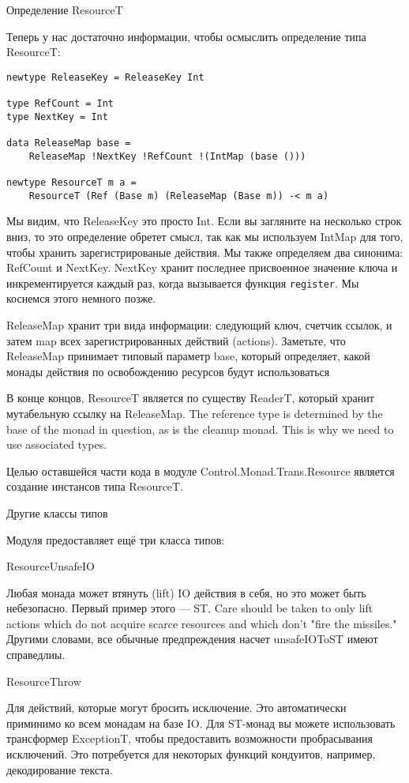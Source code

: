 Определение ResourceT

Теперь у нас достаточно информации, чтобы осмыслить определение типа ResourceT:
\begin{lstlisting}
newtype ReleaseKey = ReleaseKey Int

type RefCount = Int
type NextKey = Int

data ReleaseMap base =
    ReleaseMap !NextKey !RefCount !(IntMap (base ()))

newtype ResourceT m a =
    ResourceT (Ref (Base m) (ReleaseMap (Base m)) -< m a)
\end{lstlisting}
Мы видим, что ReleaseKey это просто Int. Если вы загляните на несколько строк вниз, то
это определение обретет смысл, так как мы используем IntMap для того, чтобы хранить
зарегистрированые действия. Мы также определяем два синонима: RefCount и NextKey. NextKey
хранит последнее присвоенное значение ключа и инкрементируется каждый раз, когда
вызывается функция \verb=register=. Мы коснемся этого немного позже.

ReleaseMap хранит три вида информации: следующий ключ, счетчик ссылок, и затем map всех
зарегистрированных действий (actions). Заметьте, что ReleaseMap принимает типовый
параметр base, который определяет, какой монады действия по освобождению ресурсов  будут
использоваться 

В конце концов, ResourceT является по существу ReaderT, который хранит мутабельную
ссылку на ReleaseMap. The reference type is determined by the base
of the monad in question, as is the cleanup monad. This is why we need to use associated
types.

Целью оставшейся части кода в модуле Control.Monad.Trans.Resource
является создание инстансов типа ResourceT.

Другие классы типов

Модуля предоставляет ещё три класса типов:
   
ResourceUnsafeIO

Любая монада может втянуть (lift) IO действия в себя, но это может быть небезопасно.
Первый пример этого --- ST. Care should be taken to
only lift actions which do not acquire scarce resources and which don't "fire the
missiles." Другими словами, все обычные предпреждения насчет unsafeIOToST имеют
справедлиы.
  
ResourceThrow

Для действий, которые могут бросить исключение.  Это автоматически приминимо ко всем
монадам на базе IO. Для ST-монад вы можете использовать трансформер ExceptionT, чтобы
предоставить возможности пробрасывания исключений. Это потребуется для некоторых функций
кондуитов, например, декодирование текста.
   
